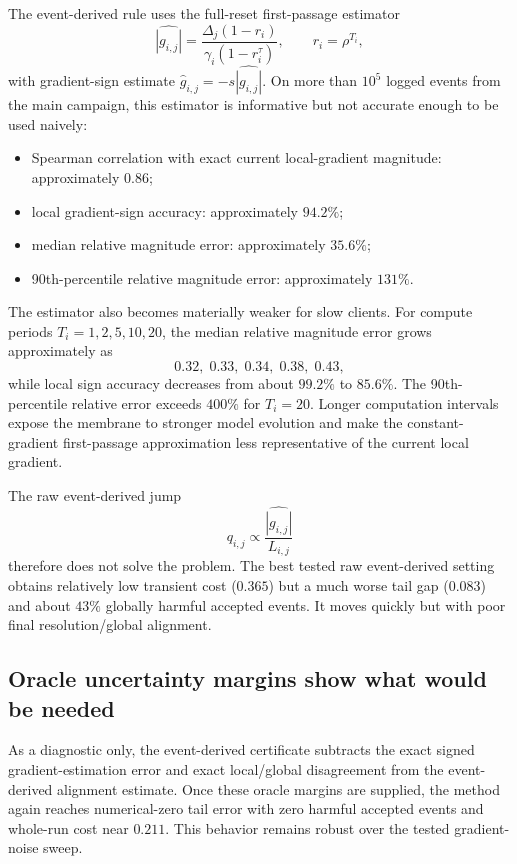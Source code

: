 The event-derived rule uses the full-reset first-passage estimator
\begin{equation}
  \widehat{|g_{i,j}|}
  =
  \frac{\Delta_j(1-r_i)}{\gamma_i(1-r_i^\tau)},
  \qquad r_i=\rho^{T_i},
\end{equation}
with gradient-sign estimate $\hat g_{i,j}=-s\widehat{|g_{i,j}|}$. On more than $10^5$ logged events from the main campaign, this estimator is informative but not accurate enough to be used naively:
\begin{itemize}
  \item Spearman correlation with exact current local-gradient magnitude: approximately $0.86$;
  \item local gradient-sign accuracy: approximately $94.2\%$;
  \item median relative magnitude error: approximately $35.6\%$;
  \item 90th-percentile relative magnitude error: approximately $131\%$.
\end{itemize}
The estimator also becomes materially weaker for slow clients. For compute periods $T_i=1,2,5,10,20$, the median relative magnitude error grows approximately as
\begin{equation}
  0.32,\;0.33,\;0.34,\;0.38,\;0.43,
\end{equation}
while local sign accuracy decreases from about $99.2\%$ to $85.6\%$. The 90th-percentile relative error exceeds $400\%$ for $T_i=20$. Longer computation intervals expose the membrane to stronger model evolution and make the constant-gradient first-passage approximation less representative of the current local gradient.

The raw event-derived jump
\begin{equation}
  q_{i,j}\propto\frac{\widehat{|g_{i,j}|}}{L_{i,j}}
\end{equation}
therefore does not solve the problem. The best tested raw event-derived setting obtains relatively low transient cost ($0.365$) but a much worse tail gap ($0.083$) and about $43\%$ globally harmful accepted events. It moves quickly but with poor final resolution/global alignment.

\subsection{Oracle uncertainty margins show what would be needed}

As a diagnostic only, the event-derived certificate subtracts the exact signed gradient-estimation error and exact local/global disagreement from the event-derived alignment estimate. Once these oracle margins are supplied, the method again reaches numerical-zero tail error with zero harmful accepted events and whole-run cost near $0.211$. This behavior remains robust over the tested gradient-noise sweep.


